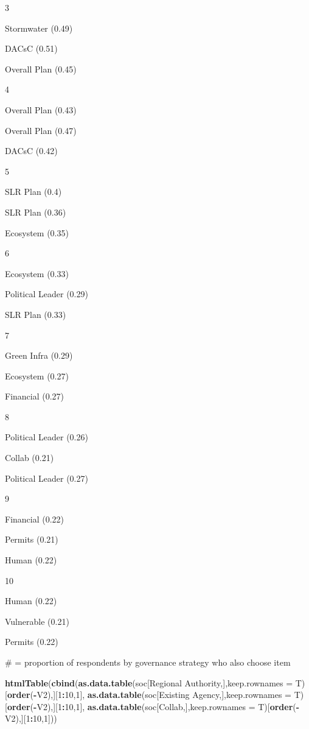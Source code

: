 \documentclass[
]{article}
\newenvironment{Shaded}{\begin{snugshade}}{\end{snugshade}}
\newcommand{\DataTypeTok}[1]{\textcolor[rgb]{0.13,0.29,0.53}{#1}}
\newcommand{\DecValTok}[1]{\textcolor[rgb]{0.00,0.00,0.81}{#1}}
\newcommand{\KeywordTok}[1]{\textcolor[rgb]{0.13,0.29,0.53}{\textbf{#1}}}
\newcommand{\NormalTok}[1]{#1}
\newcommand{\OperatorTok}[1]{\textcolor[rgb]{0.81,0.36,0.00}{\textbf{#1}}}
\newcommand{\StringTok}[1]{\textcolor[rgb]{0.31,0.60,0.02}{#1}}
\begin{document}
3

Stormwater (0.49)

DACsC (0.51)

Overall Plan (0.45)

4

Overall Plan (0.43)

Overall Plan (0.47)

DACsC (0.42)

5

SLR Plan (0.4)

SLR Plan (0.36)

Ecosystem (0.35)

6

Ecosystem (0.33)

Political Leader (0.29)

SLR Plan (0.33)

7

Green Infra (0.29)

Ecosystem (0.27)

Financial (0.27)

8

Political Leader (0.26)

Collab (0.21)

Political Leader (0.27)

9

Financial (0.22)

Permits (0.21)

Human (0.22)

10

Human (0.22)

Vulnerable (0.21)

Permits (0.22)

\# = proportion of respondents by governance strategy who also choose
item

\begin{Shaded}
\begin{Highlighting}[]
\KeywordTok{htmlTable}\NormalTok{(}\KeywordTok{cbind}\NormalTok{(}\KeywordTok{as.data.table}\NormalTok{(soc[}\StringTok{\textquotesingle{}Regional Authority\textquotesingle{}}\NormalTok{,],}\DataTypeTok{keep.rownames =}\NormalTok{ T)[}\KeywordTok{order}\NormalTok{(}\OperatorTok{{-}}\NormalTok{V2),][}\DecValTok{1}\OperatorTok{:}\DecValTok{10}\NormalTok{,}\DecValTok{1}\NormalTok{],}
\KeywordTok{as.data.table}\NormalTok{(soc[}\StringTok{\textquotesingle{}Existing Agency\textquotesingle{}}\NormalTok{,],}\DataTypeTok{keep.rownames =}\NormalTok{ T)[}\KeywordTok{order}\NormalTok{(}\OperatorTok{{-}}\NormalTok{V2),][}\DecValTok{1}\OperatorTok{:}\DecValTok{10}\NormalTok{,}\DecValTok{1}\NormalTok{],}
\KeywordTok{as.data.table}\NormalTok{(soc[}\StringTok{\textquotesingle{}Collab\textquotesingle{}}\NormalTok{,],}\DataTypeTok{keep.rownames =}\NormalTok{ T)[}\KeywordTok{order}\NormalTok{(}\OperatorTok{{-}}\NormalTok{V2),][}\DecValTok{1}\OperatorTok{:}\DecValTok{10}\NormalTok{,}\DecValTok{1}\NormalTok{]))}
\end{Highlighting}
\end{Shaded}
\end{document}
